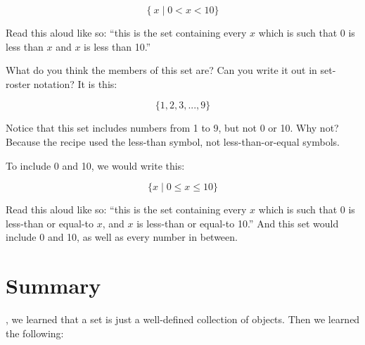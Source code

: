\documentclass[../../../main.tex]{subfiles}
\begin{document}
\begin{equation*}
  \{~x \mid 0 < x < 10 \}
\end{equation*}

Read this aloud like so: ``this is the set containing every $x$ which is such that 0 is less than $x$ and $x$ is less than 10.'' 

What do you think the members of this set are? Can you write it out in set-roster notation? It is this:

\begin{equation*}
  \{ 1, 2, 3, ..., 9 \}
\end{equation*}

Notice that this set includes numbers from 1 to 9, but not 0 or 10. Why not? Because the recipe used the less-than symbol, not less-than-or-equal symbols. 

To include 0 and 10, we would write this:

\begin{equation*}
  \{ x \mid 0 \leq x \leq 10 \}
\end{equation*}

Read this aloud like so: ``this is the set containing every $x$ which is such that 0 is less-than or equal-to $x$, and $x$ is less-than or equal-to 10.'' And this set would include 0 and 10, as well as every number in between.


\section{Summary}

, we learned that a set is just a well-defined collection of objects. Then we learned the following:
\end{document}
